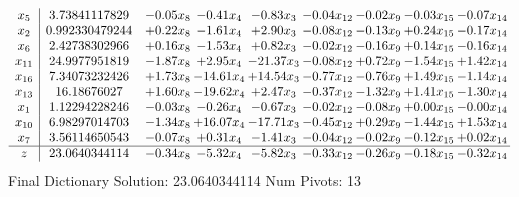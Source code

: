 \documentclass[9pt]{article}
\begin{document}
 \[\begin{array}{c| c c@{\hskip 2pt} c@{\hskip 2pt} c@{\hskip 2pt} c@{\hskip 2pt} c@{\hskip 2pt} c@{\hskip 2pt} c@{\hskip 2pt} }
 x_{5}   &  3.73841117829 & -0.05 x_{8} & -0.41 x_{4} & -0.83 x_{3} & -0.04 x_{12} & -0.02 x_{9} & -0.03 x_{15} & -0.07 x_{14}\\
 x_{2}   &  0.992330479244 & +  0.22 x_{8} & -1.61 x_{4} & +  2.90 x_{3} & -0.08 x_{12} & -0.13 x_{9} & +  0.24 x_{15} & -0.17 x_{14}\\
 x_{6}   &  2.42738302966 & +  0.16 x_{8} & -1.53 x_{4} & +  0.82 x_{3} & -0.02 x_{12} & -0.16 x_{9} & +  0.14 x_{15} & -0.16 x_{14}\\
 x_{11}   &  24.9977951819 & -1.87 x_{8} & +  2.95 x_{4} & -21.37 x_{3} & -0.08 x_{12} & +  0.72 x_{9} & -1.54 x_{15} & +  1.42 x_{14}\\
 x_{16}   &  7.34073232426 & +  1.73 x_{8} & -14.61 x_{4} & + 14.54 x_{3} & -0.77 x_{12} & -0.76 x_{9} & +  1.49 x_{15} & -1.14 x_{14}\\
 x_{13}   &  16.18676027 & +  1.60 x_{8} & -19.62 x_{4} & +  2.47 x_{3} & -0.37 x_{12} & -1.32 x_{9} & +  1.41 x_{15} & -1.30 x_{14}\\
 x_{1}   &  1.12294228246 & -0.03 x_{8} & -0.26 x_{4} & -0.67 x_{3} & -0.02 x_{12} & -0.08 x_{9} & +  0.00 x_{15} & -0.00 x_{14}\\
 x_{10}   &  6.98297014703 & -1.34 x_{8} & + 16.07 x_{4} & -17.71 x_{3} & -0.45 x_{12} & +  0.29 x_{9} & -1.44 x_{15} & +  1.53 x_{14}\\
 x_{7}   &  3.56114650543 & -0.07 x_{8} & +  0.31 x_{4} & -1.41 x_{3} & -0.04 x_{12} & -0.02 x_{9} & -0.12 x_{15} & +  0.02 x_{14}\\
\hline
z    &  23.0640344114 & -0.34 x_{8} & -5.32 x_{4} & -5.82 x_{3} & -0.33 x_{12} & -0.26 x_{9} & -0.18 x_{15} & -0.32 x_{14}\\
\end{array}\]
Final Dictionary
Solution:  23.0640344114
Num Pivots:  13
\end{document}
